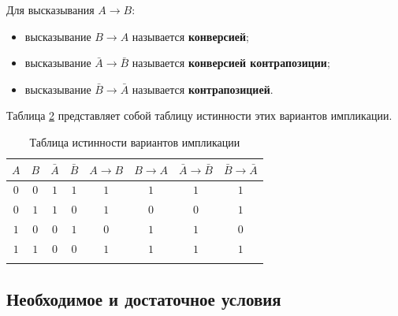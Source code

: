 \documentclass[a5paper, 11pt]{extarticle}
\theoremstyle{definition}
\theoremstyle{definition}
\theoremstyle{definition}
\numberwithin{figure}{section}
\numberwithin{table}{section}
\begin{document}
Для высказывания \(A \to B\):
\begin{itemize}
    \item высказывание \(B \to A\) называется \textbf{конверсией};
    \item высказывание \(\bar{A} \to \bar{B}\) называется \textbf{конверсией контрапозиции};
    \item высказывание \(\bar{B} \to \bar{A}\) называется \textbf{контрапозицией}.
\end{itemize}

Таблица \ref{tab:truth-table-implication} представляет собой таблицу истинности этих вариантов импликации.

\begin{table}[H]
    \renewcommand*{\arraystretch}{1.5}
    \begin{longtable}{|c|c|c|c|c|c|c|c|}
        \hline
        \(A\) & \(B\) & \(\bar{A}\) & \(\bar{B}\) & \(A \to B\) & \(B \to A\) & \(\bar{A} \to \bar{B}\) & \(\bar{B} \to \bar{A}\) \\
        \hline
        \(0\) & \(0\) & \(1\)       & \(1\)       & \(1\)       & \(1\)       & \(1\)                   & \(1\)                   \\
        \hline
        \(0\) & \(1\) & \(1\)       & \(0\)       & \(1\)       & \(0\)       & \(0\)                   & \(1\)                   \\
        \hline
        \(1\) & \(0\) & \(0\)       & \(1\)       & \(0\)       & \(1\)       & \(1\)                   & \(0\)                   \\
        \hline
        \(1\) & \(1\) & \(0\)       & \(0\)       & \(1\)       & \(1\)       & \(1\)                   & \(1\)                   \\
        \hline
        \caption{Таблица истинности вариантов импликации}
        \label{tab:truth-table-implication}
    \end{longtable}
\end{table}

\subsection{Необходимое и достаточное условия}
\end{document}
